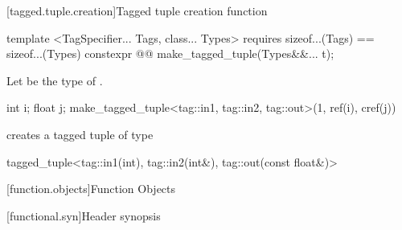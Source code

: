 {[tagged.tuple.creation]{Tagged tuple creation function}

%
%
\begin{itemdecl}
template <TagSpecifier... Tags, class... Types>
  requires sizeof...(Tags) == sizeof...(Types)
    constexpr @\oldtxt{\seebelow}@ make_tagged_tuple(Types&&... t);
\end{itemdecl}

\begin{itemdescr}
\pnum
Let  be the type of .

\pnum
\oldtxt{\returns} 

\pnum
\enterexample

\begin{codeblock}
int i; float j;
make_tagged_tuple<tag::in1, tag::in2, tag::out>(1, ref(i), cref(j))
\end{codeblock}

creates a tagged tuple of type

\begin{codeblock}
tagged_tuple<tag::in1(int), tag::in2(int&), tag::out(const float&)>
\end{codeblock}
\exitexample
\end{itemdescr}
} %

\setcounter{section}{13}
[function.objects]{Function Objects}

[functional.syn]{Header  synopsis}

